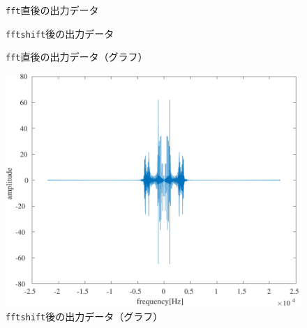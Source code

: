 \begin{figure}[h]
    \centering
    \begin{minipage}[b]{.48\textwidth}
        \centering
        
        \caption{\texttt{fft}直後の出力データ}
        \label{fig:fft直後のデータ}
    \end{minipage}
    \begin{minipage}[b]{.48\textwidth}
        \centering
        
        \caption{\texttt{fftshift}後の出力データ}
        \label{fig:fftshift後のデータ}
    \end{minipage}
    \begin{minipage}[b]{.48\textwidth}
        \centering
        
        \caption{\texttt{fft}直後の出力データ（グラフ）}
        \label{fig:fft直後のデータ（グラフ）}
    \end{minipage}
    \begin{minipage}[b]{.48\textwidth}
        \centering
        
        \caption{\texttt{fftshift}後の出力データ（グラフ）}
        \label{fig:fftshift後のデータ（グラフ）}
    \end{minipage}
    \begin{minipage}{.48\textwidth}
        \centering
        \includegraphics[keepaspectratio,width=.9\textwidth]{Figures/fft_fftshift.pdf}
    \end{minipage}
    \begin{minipage}{.48\textwidth}
        \centering

\end{minipage}
\end{figure}
